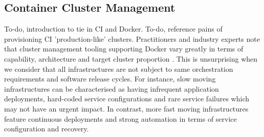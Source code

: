 \documentclass{report}
\begin{document}

\subsection{Container Cluster Management}
To-do, introduction to tie in CI and Docker. To-do, reference pains of provisioning CI 'production-like' clusters. Practitioners and industry experts note that cluster management tooling supporting Docker
vary greatly in terms of capability, architecture and target cluster proportion
\citep{goasguen, holla}. This is unsurprising when we consider that all infrastructures 
are not subject to same orchestration requirements and software release cycles.
For instance, slow moving infrastructures can be characterised as having infrequent application deployments,
 hard-coded service configurations and rare service failures which may not have an urgent impact. In contrast, more fast moving infrastructures feature continuous deployments and strong automation in terms of service configuration and recovery. 
\end{document}
